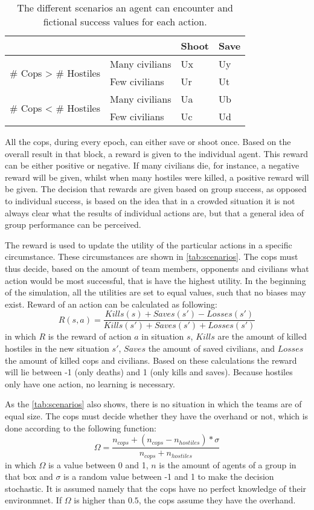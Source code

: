 \begin{table}[!ht]
\begin{center}
\begin{tabular}{l l | l l}
\hline
 & & Shoot & Save \\
\hline
\multirow{2}{*}{\# Cops > \# Hostiles} & Many civilians & Ux & Uy \\
 & Few civilians & Ur & Ut \\
\hline
\multirow{2}{*}{\# Cops < \# Hostiles} & Many civilians & Ua & Ub\\
 & Few civilians & Uc & Ud\\
\hline
\end{tabular}
\caption{The different scenarios an agent can encounter and fictional success values for each action.}
\label{tab:scenarios}
\end{center}
\end{table}
All the cops, during every epoch, can either save or shoot once. Based on the overall result in that block, a reward is given to the individual agent. This reward can be either positive or negative. If many civilians die, for instance, a negative reward will be given, whilst when many hostiles were killed, a positive reward will be given. The decision that rewards are given based on group success, as opposed to individual success, is based on the idea that in a crowded situation it is not always clear what the results of individual actions are, but that a general idea of group performance can be perceived. 

The reward is used to update the utility of the particular actions in a specific circumstance. These circumstances are shown in \autoref{tab:scenarios}. The cops must thus decide, based on the amount of team members, opponents and civilians what action would be most successful, that is have the highest utility. In the beginning of the simulation, all the utilities are set to equal values, such that no biases may exist. Reward of an action can be calculated as following: 
$$ R(s,a) = \frac{Kills(s) + Saves(s') - Losses(s')}{Kills(s') + Saves(s') + Losses(s')}$$
in which $R$ is the reward of action $a$ in situation $s$, $Kills$ are the amount of killed hostiles in the new situation $s'$, $Saves$ the amount of saved civilians, and $Losses$ the amount of killed cops and civilians. Based on these calculations the reward will lie between -1 (only deaths) and 1 (only kills and saves). Because hostiles only have one action, no learning is necessary. 

As the \autoref{tab:scenarios} also shows, there is no situation in which the teams are of equal size. The cops must decide whether they have the overhand or not, which is done according to the following function:
$$ \Omega = \frac{n_{cops} + (n_{cops}-n_{hostiles})*\sigma}{n_{cops} + n_{hostiles}} $$
in which $\Omega$ is a value between 0 and 1, $n$ is the amount of agents of a group in that box and $\sigma$ is a random value between -1 and 1 to make the decision stochastic. It is assumed namely that the cops have no perfect knowledge of their environmnet. If $\Omega$ is higher than $0.5$, the cops assume they have the overhand.

